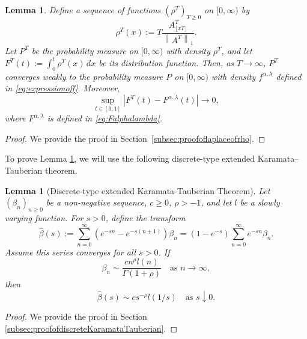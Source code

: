 \documentclass[letterpaper]{article}
\numberwithin{equation}{section}
\newtheorem{lemma}[theorem]{Lemma}
\theoremstyle{definition}
\theoremstyle{remark}
\newcommand{\norm}[1]{\left\lVert#1\right\rVert}
\begin{document}
\begin{lemma}\label{lemma:laplaceofrho}
  Define a sequence of functions $(\rho^T)_{T\ge0}$ on $[0, \infty)$ by
  \begin{equation}\label{eq:rho_T_def}
    \rho^T(x) := T\frac{A_{\lfloor xT \rfloor}^T}{\norm {A^T}_1}.
  \end{equation}
  {Let $P^T$ be the probability measure on $[0,\infty)$ with density $\rho^T$, and let $F^T(t):=\int_0^t\rho^T(x)\,dx$ be its distribution function.}
  {Then, as $T\to\infty$, $P^T$ converges weakly to the probability measure $P$ on $[0,\infty)$ with density $f^{\alpha,\lambda}$ defined in \eqref{eq:expressionoff}.}
  {Moreover,}
  \[
    {\sup_{t\in[0,1]}\left|F^T(t)-F^{\alpha,\lambda}(t)\right|\to 0,}
  \]
  {where $F^{\alpha,\lambda}$ is defined in \eqref{eq:Falphalambda}.}
\end{lemma}

\begin{proof}
  We provide the proof in Section~\ref{subsec:proofoflaplaceofrho}.
\end{proof}

To prove Lemma \ref{lemma:laplaceofrho}, we will use the following discrete-type extended Karamata--Tauberian theorem.

\begin{lemma}[Discrete-type extended Karamata-Tauberian Theorem]\label{lemma:discreteKaramataTauberian}
  Let $(\beta_n)_{n\ge0}$ be a non-negative sequence, $c \ge 0$, $\rho > -1$, and let $l$ be a slowly varying function. For $s>0$, define the transform
  \[
    \hat{\beta}(s) := \sum_{n=0}^\infty (e^{-sn} - e^{-s(n+1)}) \beta_n = (1 - e^{-s}) \sum_{n=0}^\infty e^{-sn} \beta_n.
  \]
  Assume this series converges for all $s > 0$. If
  \[
    \beta_n \sim \frac{c n^\rho l(n)}{\Gamma(1+\rho)} \quad \text{as } n \to \infty,
  \]
  then
  \[
    \hat{\beta}(s) \sim c s^{-\rho} l(1/s) \quad \text{as } s \downarrow 0.
  \]
\end{lemma}

\begin{proof}
  We provide the proof in Section \ref{subsec:proofofdiscreteKaramataTauberian}.
\end{proof}
\end{document}
